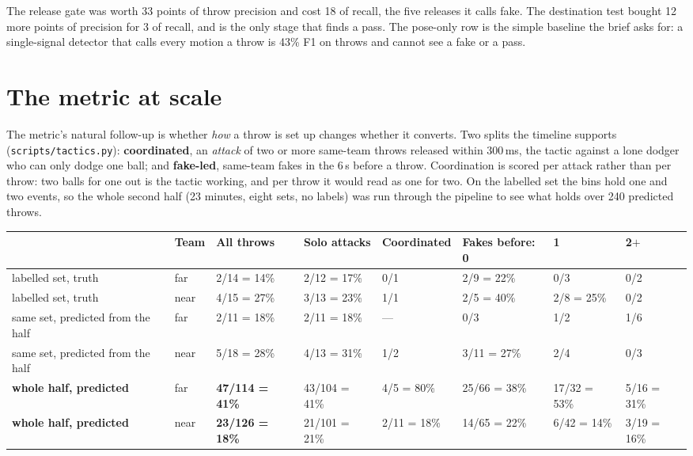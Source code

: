 \documentclass[10pt,a4paper]{article}
\begin{document}
The release gate was worth 33 points of throw precision and cost 18 of recall, the five
releases it calls fake. The destination test bought 12 more points of precision for 3 of
recall, and is the only stage that finds a pass. The pose-only row is the simple
baseline the brief asks for: a single-signal detector that calls every motion a throw is
43\% F1 on throws and cannot see a fake or a pass.

\section{The metric at scale}
\label{sec:scale}

The metric's natural follow-up is whether \emph{how} a throw is set up changes whether it
converts. Two splits the timeline supports (\texttt{scripts/tactics.py}):
\textbf{coordinated}, an \emph{attack} of two or more same-team throws released within
300\,ms, the tactic against a lone dodger who can only dodge one ball; and
\textbf{fake-led}, same-team fakes in the 6\,s before a throw. Coordination is scored per
attack rather than per throw: two balls for one out is the tactic working, and per throw it
would read as one for two. On the labelled set the bins hold one and two events, so the
whole second half (23 minutes, eight sets, no labels) was run through the pipeline to see
what holds over 240 predicted throws.

{\footnotesize
\begin{xltabular}{\textwidth}{L{30mm} L{8mm} L{18mm} L{18mm} L{18mm} L{16mm} L{13mm} L{13mm}}
\toprule
 & \textbf{Team} & \textbf{All throws} & \textbf{Solo attacks} & \textbf{Coordinated} & \textbf{Fakes before: 0} & \textbf{1} & \textbf{2$+$}\\
\midrule
labelled set, truth & far & 2/14 = 14\% & 2/12 = 17\% & 0/1 & 2/9 = 22\% & 0/3 & 0/2\\
labelled set, truth & near & 4/15 = 27\% & 3/13 = 23\% & 1/1 & 2/5 = 40\% & 2/8 = 25\% & 0/2\\
same set, predicted from the half & far & 2/11 = 18\% & 2/11 = 18\% & --- & 0/3 & 1/2 & 1/6\\
same set, predicted from the half & near & 5/18 = 28\% & 4/13 = 31\% & 1/2 & 3/11 = 27\% & 2/4 & 0/3\\
\textbf{whole half, predicted} & far & \textbf{47/114 = 41\%} & 43/104 = 41\% & 4/5 = 80\% & 25/66 = 38\% & 17/32 = 53\% & 5/16 = 31\%\\
\textbf{whole half, predicted} & near & \textbf{23/126 = 18\%} & 21/101 = 21\% & 2/11 = 18\% & 14/65 = 22\% & 6/42 = 14\% & 3/19 = 16\%\\
\bottomrule
\end{xltabular}}
\end{document}

